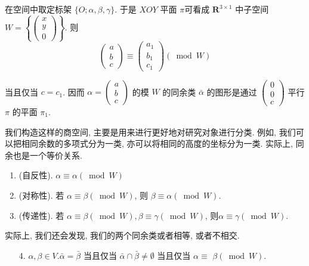 \documentclass{ctexart}
\begin{document}
\begin{example}[空间坐标的同余]
    在空间中取定标架 $\{O ; \alpha, \beta, \gamma\}$. 于是 $X O Y$ 平面 $\pi$可看成 $\mathbf{R}^{3 \times 1}$ 中子空间 $W=\left\{\left(\begin{array}{l}x \\ y \\ 0\end{array}\right)\right\}$. 则
$$
\left(\begin{array}{l}
a \\
b \\
c
\end{array}\right) \equiv\left(\begin{array}{l}
a_1 \\
b_1 \\
c_1
\end{array}\right)(\bmod W)
$$

当且仅当 $c=c_1$. 因而 $\alpha=\left(\begin{array}{l}a \\ b \\ c\end{array}\right)$ 的模 $W$ 的同余类 $\bar{\alpha}$ 的图形是通过 $\left(\begin{array}{l}0 \\ 0 \\ c\end{array}\right)$ 平行 $\pi$ 的平面 $\pi_1$.
\end{example}

我们构造这样的商空间, 主要是用来进行更好地对研究对象进行分类. 例如, 我们可以把相同余数的多项式分为一类, 亦可以将相同的高度的坐标分为一类. 实际上, 同余也是一个等价关系. 

\begin{enumerate}

    \item (自反性). $\alpha \equiv \alpha(\bmod W)$
    \item (对称性). 若 $\alpha \equiv \beta(\bmod W)$, 则 $\beta \equiv \alpha(\bmod W)$.
    \item (传递性). 若 $\alpha \equiv \beta(\bmod W), \beta \equiv \gamma(\bmod W)$, 则$\alpha \equiv \gamma(\bmod W)$.
\end{enumerate}

实际上, 我们还会发现, 我们的两个同余类或者相等, 或者不相交.

\begin{itemize}
    \item [4.] $\alpha, \beta \in V . \bar{\alpha}=\bar{\beta}$ 当且仅当 $\bar{\alpha} \cap \bar{\beta} \neq \emptyset$ 当且仅当 $\alpha \equiv$ $\beta(\bmod W)$.
\end{itemize}
\end{document}
